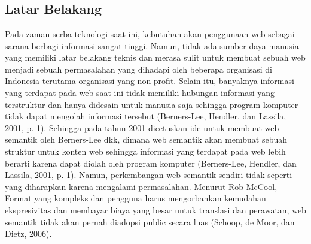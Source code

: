 \chapter{\babSatu}


\section{Latar Belakang}

Pada zaman serba teknologi saat ini, kebutuhan akan penggunaan web sebagai sarana berbagi informasi sangat tinggi. Namun, tidak ada sumber daya manusia yang memiliki latar belakang teknis dan merasa sulit untuk membuat sebuah web menjadi sebuah permasalahan yang dihadapi oleh beberapa organisasi di Indonesia terutama organisasi yang non-profit. Selain itu, banyaknya informasi yang terdapat pada web saat ini tidak memiliki hubungan informasi yang terstruktur dan hanya didesain untuk manusia saja sehingga program komputer tidak dapat mengolah informasi tersebut (Berners-Lee, Hendler, dan Lassila, 2001, p. 1). 
Sehingga pada tahun 2001 dicetuskan ide untuk membuat web semantik oleh Berners-Lee dkk, dimana web semantik akan membuat sebuah struktur untuk konten web sehingga informasi yang terdapat pada web lebih berarti karena dapat diolah oleh program komputer (Berners-Lee, Hendler, dan Lassila, 2001, p. 1). Namun, perkembangan web semantik sendiri tidak seperti yang diharapkan karena mengalami permasalahan. Menurut Rob McCool, Format yang kompleks dan pengguna harus mengorbankan kemudahan ekspresivitas dan membayar biaya yang besar untuk translasi dan perawatan, web semantik tidak akan pernah diadopsi public secara luas (Schoop, de Moor, dan Dietz, 2006).

